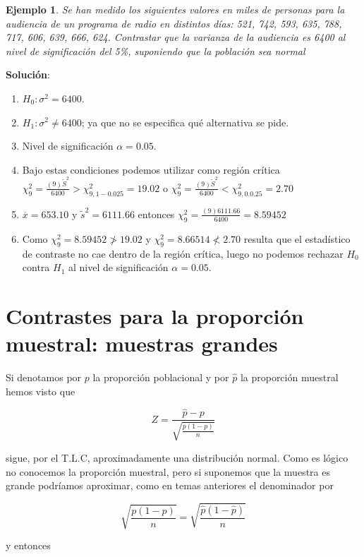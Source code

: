 \documentclass[12pt]{report}
\newtheorem{example}[definition]{Ejemplo}
\begin{document}
    \begin{example}
    Se han medido los siguientes valores en miles de personas para la
    audiencia de un programa de radio en distintos días:
    521, 742, 593, 635, 788, 717, 606, 639, 666, 624.
    Contrastar que la varianza de la audiencia es 6400
    al nivel de significación del 5\%,
    suponiendo que la población sea normal
    \end{example}
    \textbf{Solución}:
\begin{enumerate}[1)]
    \item $H_{0}:\sigma^2=6400.$
    \item $H_{1}:\sigma^2\not=6400$; ya que no se especifica qué alternativa
    se pide.
    \item Nivel de significación $\alpha=0.05$.
      \item Bajo estas condiciones podemos utilizar como región crítica 
        $\chi_{9}^2=\frac{(9)
    \tilde{S}^2}{6400}>\chi_{9,1-0.025}^2=19.02$ o
        $\chi_{9}^2=\frac{(9)
    \tilde{S}^2}{6400}<\chi_{9,0.0.25}^2=2.70$
    \item $\overline{x}=653.10$ y $\tilde{s}^2= 6111.66$
    entonces
    $\chi_{9}^2=\frac{(9)  6111.66}{6400}=8.59452$
    \item Como $\chi_{9}^2=8.59452\not>19.02$ y $\chi_{9}^2=8.66514\not<2.70$
    resulta que el estadístico de contraste no cae dentro de la región
    crítica, luego no podemos rechazar $H_{0}$ contra $H_{1}$ al nivel de
    significación $\alpha=0.05$.
    \end{enumerate}

%      
%     
       \section{Contrastes para la proporción muestral: muestras grandes}

      Si denotamos por $p$ la proporción poblacional y por $\hat{p}$
      la proporción muestral hemos visto que

      $$Z=\frac{\hat{p}-p}{\sqrt{\frac{p(1-p)}{n}}}$$

      sigue, por el T.L.C, aproximadamente una distribución normal.
      Como es lógico no conocemos la proporción muestral, pero si
      suponemos que la muestra es grande podríamos aproximar, como en
      temas anteriores el denominador por

      $$\sqrt{\frac{p(1-p)}{n}}=\sqrt{\frac{\hat{p}(1-\hat{p})}{n}}$$

      y entonces
\end{document}

